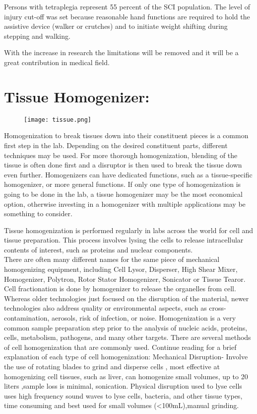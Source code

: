 \documentclass[a4paper,12pt]{article}
\begin{document}
Persons with tetraplegia represent 55 percent of the SCI population. The level of injury cut-off was set because reasonable hand functions are required to hold the assistive device (walker or crutches) and to initiate weight shifting during stepping and walking.

With the increase in research the limitations will be removed and it will be a great contribution in medical field.
\clearpage


\section{Tissue Homogenizer:}
\begin{figure}[h]
	\texttt{[image: tissue.png]}
\end{figure}
\medspace

Homogenization to break tissues down into their constituent pieces is a common first step in the lab. Depending on the desired constituent parts, different techniques may be used. For more thorough homogenization, blending of the tissue is often done first and a disruptor is then used to break the tissue down even further. Homogenizers can have dedicated functions, such as a tissue-specific homogenizer, or more general functions. If only one type of homogenization is going to be done in the lab, a tissue homogenizer may be the most economical option, otherwise investing in a homogenizer with multiple applications may be something to consider.

Tissue homogenization is performed regularly in labs across the world for 
cell and tissue preparation. This process involves lysing the cells to 
release intracellular contents of interest, such as proteins and nuclear 
components.
\\
There are often many different names for the same piece of mechanical 
homogenizing equipment, including Cell Lysor, Disperser, High Shear Mixer, 
Homogenizer, Polytron, Rotor Stator Homogenizer, Sonicator or Tissue 
Tearor.
\\

Cell fractionation is done by homogenizer to release the organelles from 
cell. Whereas older technologies just focused on the disruption of the 
material, newer technologies also address quality or environmental aspects, 
such as cross-contamination, aerosols, risk of infection, or noise. 
Homogenization is a very common sample preparation step prior to the 
analysis of nucleic acids, proteins, cells, metabolism, pathogens, and many 
other targets.
There are several methods of cell homogenization that are commonly used. 
Continue reading for a brief explanation of each type of cell 
homogenization:
Mechanical Disruption-
Involve the use of rotating blades to grind and disperse cells , most 
effective at homogenizing cell tissues, such as liver, can homogenize small 
volumes, up to 20 liters ,sample loss is minimal, sonication.
Physical disruption used to lyse cells uses high frequency sound waves to 
lyse cells, bacteria, and other tissue types, time consuming and best used 
for small volumes (<100mL),manual grinding.
\end{document}
